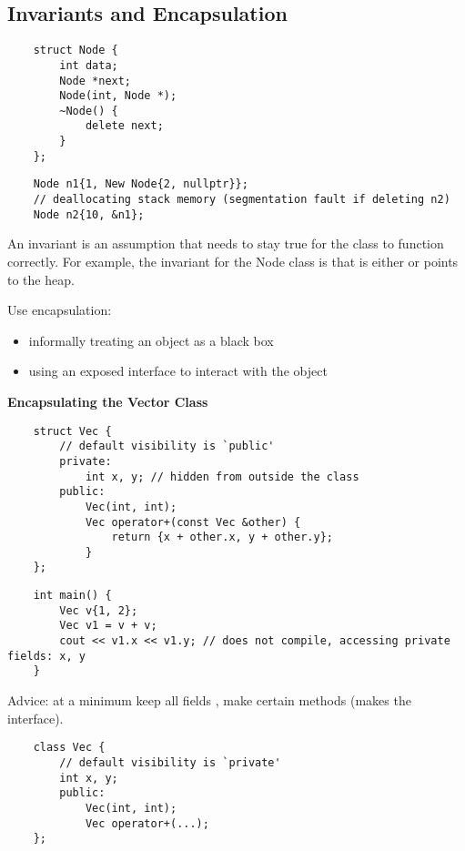 \subsection{Invariants and Encapsulation}
\begin{lstlisting}
    struct Node {
        int data;
        Node *next;
        Node(int, Node *);
        ~Node() {
            delete next;
        }
    };
\end{lstlisting}
\begin{lstlisting}
    Node n1{1, New Node{2, nullptr}};
    // deallocating stack memory (segmentation fault if deleting n2)
    Node n2{10, &n1};
\end{lstlisting}

An invariant is an assumption that needs to stay true for the class to function
correctly. For example, the invariant for the Node class is that 
is either  or points to the heap.

Use encapsulation:
\begin{itemize}
      \item informally treating an object as a black box
      \item using an exposed interface to interact with the object
\end{itemize}

\textbf{Encapsulating the Vector Class}

\begin{lstlisting}
    struct Vec {
        // default visibility is `public'
        private: 
            int x, y; // hidden from outside the class
        public:
            Vec(int, int);
            Vec operator+(const Vec &other) {
                return {x + other.x, y + other.y};
            }
    };
\end{lstlisting}
\begin{lstlisting}
    int main() {
        Vec v{1, 2};
        Vec v1 = v + v;
        cout << v1.x << v1.y; // does not compile, accessing private fields: x, y
    }
\end{lstlisting}

Advice: at a minimum keep all fields , make certain methods 
(makes the interface).

\begin{lstlisting}
    class Vec {
        // default visibility is `private'
        int x, y;
        public:
            Vec(int, int);
            Vec operator+(...);
    };
\end{lstlisting}
